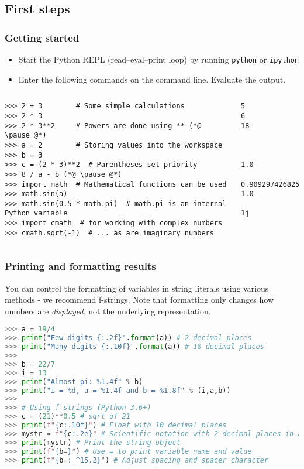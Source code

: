 \subsection{First steps}
\begin{frame}[fragile]
  \frametitle{Getting started}
  \begin{itemize}
    \item Start the Python REPL (read–eval–print loop) by running \lstinline|python| or \lstinline|ipython|
    \item Enter the following commands on the command line. Evaluate the output.
  \end{itemize}
  \pause
  \begin{columns}
      \begin{lstlisting}[numbers=none]
>>> 2 + 3        # Some simple calculations
>>> 2 * 3
>>> 2 * 3**2     # Powers are done using ** (*@ \pause @*)
>>> a = 2        # Storing values into the workspace
>>> b = 3
>>> c = (2 * 3)**2  # Parentheses set priority
>>> 8 / a - b (*@ \pause @*)
>>> import math  # Mathematical functions can be used 
>>> math.sin(a)  
>>> math.sin(0.5 * math.pi)  # math.pi is an internal Python variable
>>> import cmath  # for working with complex numbers
>>> cmath.sqrt(-1)  # ... as are imaginary numbers    
      \end{lstlisting}\pause
      \begin{lstlisting}[style=PyOutput,numbers=none]
5
6
18



1.0

0.9092974268256817
1.0

1j
      \end{lstlisting}
  \end{columns}
\end{frame}

\begin{frame}[fragile]
  \frametitle{Printing and formatting results}
  You can control the formatting of variables in string literals using various methods - we recommend f-strings. Note that formatting only changes how numbers are \emph{displayed}, not the underlying representation.

  \begin{lstlisting}[language=Python,numbers=none]
>>> a = 19/4
>>> print("Few digits {:.2f}".format(a)) # 2 decimal places
>>> print("Many digits {:.10f}".format(a)) # 10 decimal places
>>> 
>>> b = 22/7
>>> i = 13
>>> print("Almost pi: %1.4f" % b)
>>> print("i = %d, a = %1.4f and b = %1.8f" % (i,a,b))
>>>
>>> # Using f-strings (Python 3.6+)
>>> c = (21)**0.5 # sqrt of 21
>>> print(f"{c:.10f}") # Float with 10 decimal places
>>> mystr = f"{c:.2e}" # Scientific notation with 2 decimal places in a string object
>>> print(mystr) # Print the string object
>>> print(f"{b=}") # Use = to print variable name and value
>>> print(f"{b=:_^15.2}") # Adjust spacing and spacer character
  \end{lstlisting}
\end{frame}
 
